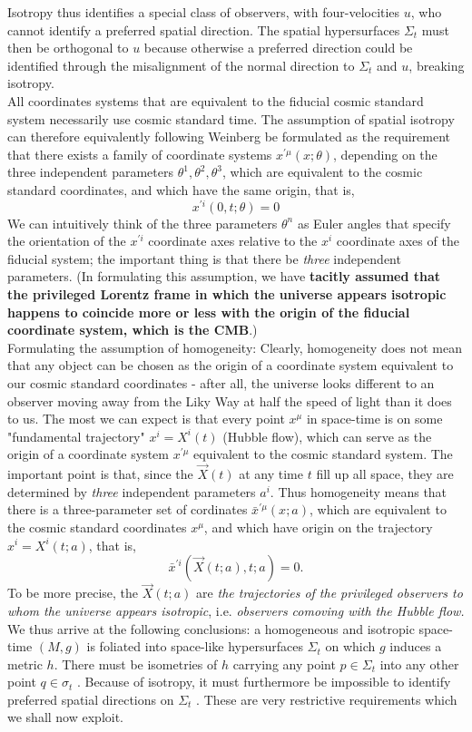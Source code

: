 Isotropy thus identifies a special class of observers, with four-velocities
$u$, who cannot identify a preferred spatial direction. The spatial hypersurfaces $\Sigma_t$ must then be orthogonal to $u$ because otherwise a preferred
direction could be identified through the misalignment of the normal
direction to $\Sigma_t$ and $u$, breaking isotropy.\\
All coordinates systems that are equivalent to the fiducial cosmic standard system necessarily use cosmic standard time. The assumption of spatial isotropy can therefore equivalently following Weinberg be formulated as the requirement that there exists a family of coordinate systems $x^{\prime \mu}(x;\theta)$, depending on the three independent parameters $\theta^1,\theta^2,\theta^3$, which are equivalent to the cosmic standard coordinates, and which have the same origin, that is,
\begin{equation}
x^{\prime i}(0,t;\theta)=0
\end{equation}
We can intuitively think of the three parameters $\theta^n$ as Euler angles that specify the orientation of the $x^{\prime i}$ coordinate axes relative to the $x^i$ coordinate axes of the fiducial system; the important thing is that there be \emph{three} independent parameters. (In formulating this assumption, we have \textbf{tacitly assumed that the privileged Lorentz frame in which the universe appears isotropic happens to coincide more or less with the origin of the fiducial coordinate system, which is the CMB}.)
\\
Formulating the assumption of homogeneity: Clearly, homogeneity does not mean that any object can be chosen as the origin of a coordinate system equivalent to our cosmic standard coordinates -  after all, the universe looks different to an observer moving away from the Liky Way at half the speed of light than it does to us. The most we can expect is that every point $x^\mu$ in space-time is on some "fundamental  trajectory" $x^i=X^i(t)$ (Hubble flow), which can serve as the origin of a coordinate system $x^{\prime \mu}$ equivalent to the cosmic standard system. The important point is that, since the $\vec{X}(t)$ at any time $t$ fill up all space, they are determined by \emph{three} independent parameters $a^i$. Thus homogeneity means that there is a three-parameter set of cordinates $\bar{x}^{\prime \mu}(x;a)$, which are equivalent to the cosmic standard coordinates $x^\mu$, and which have origin on the trajectory $x^i=X^i(t;a)$, that is,
\begin{equation}
\bar{x}^{\prime i}(\vec{X}(t;a),t;a) =0.
\end{equation}
To be more precise, the $\vec{X}(t;a)$ are \emph{the trajectories of the privileged observers to whom the universe appears isotropic}, i.e. \emph{observers comoving with the Hubble flow.}
\\
We thus arrive at the following conclusions: a homogeneous and isotropic
space-time $(M, g)$ is foliated into space-like hypersurfaces $\Sigma_t$ on which $g$
induces a metric $h$. There must be isometries of $h$ carrying any point $p \in \Sigma_t$ into any other point $q \in \sigma_t$ . Because of isotropy, it must furthermore	be impossible to identify preferred spatial directions on $\Sigma_t$ . These are
very restrictive requirements which we shall now exploit.

